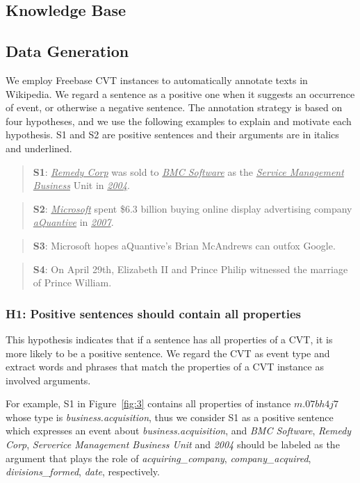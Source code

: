 \documentclass{article}
\begin{document}
\subsection{Knowledge Base}

\subsection{Data Generation}
We employ Freebase CVT instances to automatically annotate texts in Wikipedia. We regard a sentence as a positive one when it suggests an occurrence of event, or otherwise a negative sentence. The annotation strategy is based on four hypotheses, and we use the following examples to explain and motivate each hypothesis. S1 and S2 are positive sentences and their arguments are in italics and underlined.

\begin{quote}
	\textbf{S1}: \underline{\emph{Remedy Corp}} was sold to \underline{\emph{BMC Software}} as the \underline{\emph{Service Management Business}} Unit in \underline{\emph{2004}}.
\end{quote}
\begin{quote}
	\textbf{S2}: \underline{\emph{Microsoft}} spent \$6.3 billion buying online display advertising company \underline{\emph{aQuantive}} in \underline{\emph{2007}}.
\end{quote}
\begin{quote}
	\textbf{S3}: Microsoft hopes aQuantive’s Brian McAndrews can outfox Google.
\end{quote}
\begin{quote}
	\textbf{S4}: On April 29th, Elizabeth II and Prince Philip witnessed the marriage of Prince William.
\end{quote}

\subsubsection{H1: Positive sentences should contain all properties}
This hypothesis indicates that if a sentence has all properties of a CVT, it is more likely to be a positive sentence. We regard the CVT as event type and extract words and phrases that match the properties of a CVT instance as involved arguments. 

For example, S1 in Figure~\ref{fig:3} contains all properties of instance $m.07bh4j7$ whose type is \emph{business.acquisition}, thus we consider S1 as a positive sentence which expresses an event about \emph{business.acquisition}, and \emph{BMC Software}, \emph{Remedy Corp}, \emph{Serverice Management Business Unit} and \emph{2004} should be labeled as the argument that plays the role of \emph{acquiring\_company}, \emph{company\_acquired}, \emph{divisions\_formed}, \emph{date}, respectively.
\end{document}
